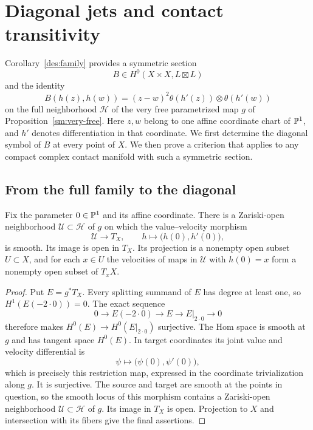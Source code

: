 \section{Diagonal jets and contact transitivity}
\label{jet:section}

Corollary~\ref{des:family} provides a symmetric section
\[
B\in H^0(X\times X,L\boxtimes L)
\]
and the identity
\begin{equation}\label{jet:family}
B(h(z),h(w))
=(z-w)^2\theta(h'(z))\otimes\theta(h'(w))
\end{equation}
on the full neighborhood $\mathcal H$ of the very free parametrized map $g$ of
Proposition~\ref{sm:very-free}. Here $z,w$ belong to one affine
coordinate chart of $\mathbb P^1$, and $h'$ denotes differentiation in that
coordinate. We first determine the diagonal symbol of $B$ at every
point of $X$. We then prove a criterion that applies to any compact
complex contact manifold with such a symmetric section.

\subsection{From the full family to the diagonal}

\begin{lemma}\label{jet:value-velocity}
Fix the parameter $0\in\mathbb P^1$ and its affine coordinate. There is a
Zariski-open neighborhood $\mathcal U\subset\mathcal H$ of $g$ on which
the value--velocity morphism
\[
\mathcal U\longrightarrow T_X,
\qquad h\longmapsto\bigl(h(0),h'(0)\bigr),
\]
is smooth. Its image is open in $T_X$. Its projection is a nonempty
open subset $U\subset X$, and for each $x\in U$ the velocities of maps
in $\mathcal U$ with $h(0)=x$ form a nonempty open subset of $T_xX$.
\end{lemma}

\begin{proof}
Put $E=g^*T_X$. Every splitting summand of $E$ has degree at least
one, so $H^1(E(-2\cdot0))=0$. The exact sequence
\[
0\longrightarrow E(-2\cdot0)\longrightarrow E
\longrightarrow E|_{2\cdot0}\longrightarrow0
\]
therefore makes $H^0(E)\to H^0(E|_{2\cdot0})$ surjective.
The Hom space is smooth at $g$ and has tangent space $H^0(E)$.
In target coordinates its joint value and velocity differential is
\[
\psi\longmapsto\bigl(\psi(0),\psi'(0)\bigr),
\]
which is precisely this restriction map, expressed in the
coordinate trivialization along $g$. It is surjective. The source and
target are smooth at the points in question, so the smooth locus of this
morphism contains a Zariski-open neighborhood $\mathcal U\subset\mathcal H$
of $g$. Its image in $T_X$ is open.
Projection to $X$ and intersection with its fibers give the final
assertions.
\end{proof}

